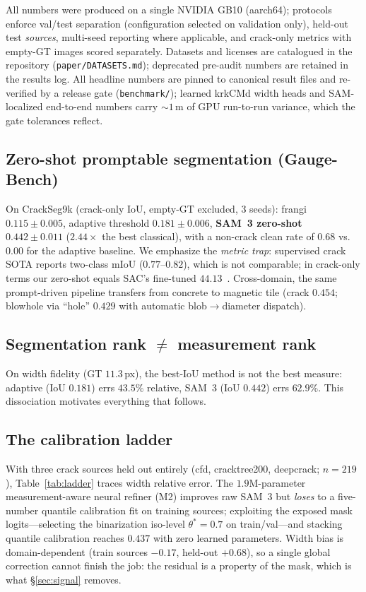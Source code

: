 \documentclass[11pt]{article}
\newcommand{\um}{\,\textmu m}
\begin{document}
All numbers were produced on a single NVIDIA GB10 (aarch64); protocols enforce val/test
separation (configuration selected on validation only), held-out test \emph{sources},
multi-seed reporting where applicable, and crack-only metrics with empty-GT images scored
separately. Datasets and licenses are catalogued in the repository
(\texttt{paper/DATASETS.md}); deprecated pre-audit numbers are retained in the results log.
All headline numbers are pinned to canonical result files and re-verified by a release gate
(\texttt{benchmark/}); learned krkCMd width heads and SAM-localized end-to-end numbers carry
${\sim}1$\um{} of GPU run-to-run variance, which the gate tolerances reflect.

\subsection{Zero-shot promptable segmentation (Gauge-Bench)}
On CrackSeg9k (crack-only IoU, empty-GT excluded, 3 seeds):
frangi $0.115\pm0.005$, adaptive threshold $0.181\pm0.006$, \textbf{SAM~3 zero-shot
$0.442\pm0.011$} ($2.44\times$ the best classical), with a non-crack clean rate of $0.68$
vs.\ $0.00$ for the adaptive baseline. We emphasize the \emph{metric trap}: supervised
crack SOTA reports two-class mIoU ($0.77$--$0.82$), which is not comparable; in crack-only
terms our zero-shot equals SAC's fine-tuned $44.13$~\citep{rostami2025sac}.
Cross-domain, the same prompt-driven pipeline transfers from concrete to magnetic tile
(crack $0.454$; blowhole via ``hole'' $0.429$ with automatic blob$\rightarrow$diameter
dispatch).

\subsection{Segmentation rank $\neq$ measurement rank}
On width fidelity (GT $11.3$\,px), the best-IoU method is not the best measure: adaptive
(IoU $0.181$) errs $43.5\%$ relative, SAM~3 (IoU $0.442$) errs $62.9\%$. This dissociation
motivates everything that follows.

\subsection{The calibration ladder}\label{sec:ladder}
With three crack sources held out entirely (cfd, cracktree200, deepcrack; $n{=}219$),
Table~\ref{tab:ladder} traces width relative error. The $1.9$M-parameter measurement-aware
neural refiner (M2) improves raw SAM~3 but \emph{loses} to a five-number quantile
calibration fit on training sources; exploiting the exposed mask logits---selecting the
binarization iso-level $\theta^\ast{=}0.7$ on train/val---and stacking quantile calibration
reaches $0.437$ with zero learned parameters. Width bias is domain-dependent (train sources
$-0.17$, held-out $+0.68$), so a single global correction cannot finish the job: the
residual is a property of the mask, which is what \S\ref{sec:signal} removes.
\end{document}

